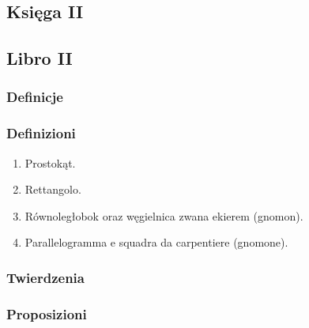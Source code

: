 
%

\subsection{Księga II} %
\subsection{Libro II} %

\subsubsection{Definicje} %
\subsubsection{Definizioni} %

\begin{enumerate}
    \item [2.1] Prostokąt. %
    \item [2.1] Rettangolo. %

    \item [2.2] Równoległobok oraz węgielnica zwana ekierem (gnomon). %
    \item [2.2] Parallelogramma e squadra da carpentiere (gnomone). %
\end{enumerate}

\subsubsection{Twierdzenia} %
\subsubsection{Proposizioni} %

